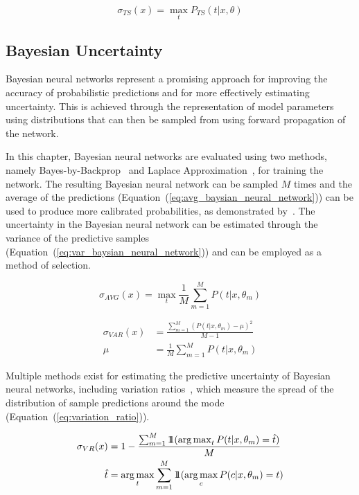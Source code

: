 \begin{equation}
	\sigma_{TS}(x) = \max_tP_{TS}(t|x,\theta)
	\label{eq:selective_temperature_scaling}
\end{equation}

\subsection{Bayesian Uncertainty}
\label{subsec:selective_uncertainity}
Bayesian neural networks represent a promising approach for improving the accuracy of probabilistic predictions and for more effectively estimating uncertainty. This is achieved through the representation of model parameters using distributions that can then be sampled from using forward propagation of the network.

In this chapter, Bayesian neural networks are evaluated using two methods, namely Bayes-by-Backprop~\citep{blundell2015weight} and Laplace Approximation~\citep{mackay1992bayesian}, for training the network. The resulting Bayesian neural network can be sampled $M$ times and the average of the predictions (Equation~(\ref{eq:avg_baysian_neural_network})) can be used to produce more calibrated probabilities, as demonstrated by~\citep{jospin2022hands}. The uncertainty in the Bayesian neural network can be estimated through the variance of the predictive samples (Equation~(\ref{eq:var_baysian_neural_network})) and can be employed as a method of selection.

\begin{equation}
	\sigma_{AVG}(x)=\max_t\frac{1}{M}\sum^M_{m=1}P(t|x,\theta_m)
	\label{eq:avg_baysian_neural_network}
\end{equation}

\begin{equation}
	\begin{aligned}
		\sigma_{VAR}(x)&=\frac{\sum^M_{m=1}(P(t|x,\theta_m)-\mu)^2}{M-1}\\
		\mu&=\frac{1}{M}\sum^M_{m=1}P(t|x,\theta_m)
	\end{aligned}
	\label{eq:var_baysian_neural_network}
\end{equation}

Multiple methods exist for estimating the predictive uncertainty of Bayesian neural networks, including variation ratios~\citep{freeman1965elementary}, which measure the spread of the distribution of sample predictions around the mode (Equation~(\ref{eq:variation_ratio})).

\begin{equation}
	\begin{aligned}
		\sigma_{VR}(x) &= 1 - \frac{\sum^M_{m=1}1\!\!1(\operatorname*{arg\,max}_tP(t|x,\theta_m)=\hat{t})}{M}\\
		\qquad\hat{t} &= \operatorname*{arg\,max}_t\sum^M_{m=1}1\!\!1(\operatorname*{arg\,max}_cP(c|x,\theta_m)=t)
	\end{aligned}
	\label{eq:variation_ratio}
\end{equation}

